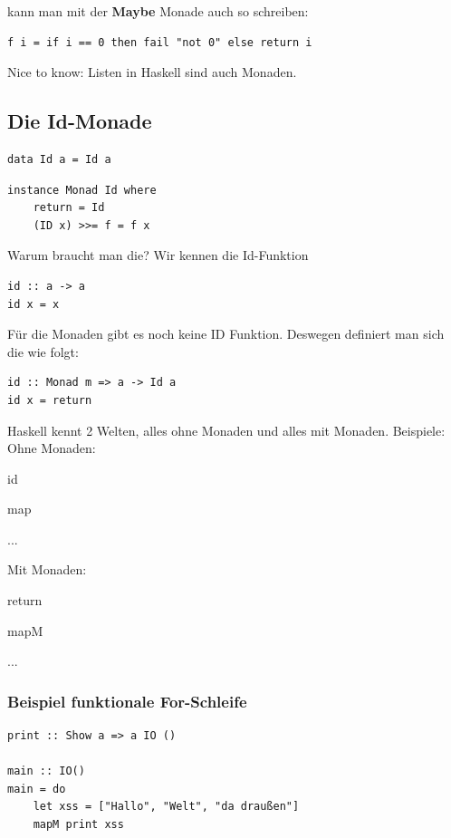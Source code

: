 \documentclass[ngerman,a4paper]{report}
\begin{document}
kann man mit der \textbf{Maybe} Monade auch so schreiben:
\begin{lstlisting}
f i = if i == 0 then fail "not 0" else return i
\end{lstlisting}
Nice to know: Listen in Haskell sind auch Monaden.

\subsection{Die Id-Monade}
\begin{lstlisting}
data Id a = Id a
\end{lstlisting}

\begin{lstlisting}
instance Monad Id where
	return = Id 
	(ID x) >>= f = f x 
\end{lstlisting}

Warum braucht man die?
Wir kennen die Id-Funktion
\begin{lstlisting}
id :: a -> a
id x = x
\end{lstlisting}

Für die Monaden gibt es noch keine ID Funktion. Deswegen definiert man sich die wie folgt:

\begin{lstlisting}
id :: Monad m => a -> Id a
id x = return
\end{lstlisting}

Haskell kennt 2 Welten, alles ohne Monaden und alles mit Monaden. 
Beispiele:
Ohne Monaden:
\begin{compactitem}
\item id
\item map
\item ...
\end{compactitem}
Mit Monaden:
\begin{compactitem}
\item return
\item mapM
\item ...
\end{compactitem}

\subsubsection{Beispiel funktionale For-Schleife}

\begin{lstlisting}
print :: Show a => a IO ()

main :: IO()
main = do
	let xss = ["Hallo", "Welt", "da draußen"]
	mapM print xss
\end{lstlisting}
\end{document}
